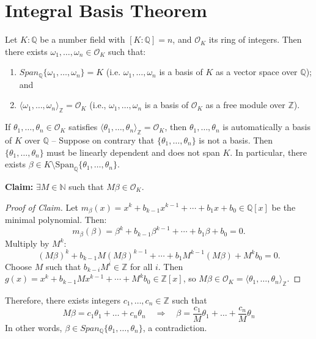 \section{Integral Basis Theorem}

\begin{theorem} \label{thm-intbasis}
Let $K:\mathbb{Q}$ be a number field with $[K:\mathbb{Q}] = n$, and $\mathcal{O}_K$ its ring of integers. Then there exists $\omega_1, \ldots, \omega_n \in \mathcal{O}_K$ such that:
\begin{enumerate}
    \item $Span_{\mathbb{Q}}\{\omega_1, \ldots, \omega_n\} = K$ (i.e. $\omega_1, \ldots, \omega_n$ is a basis of $K$ as a vector space over $\mathbb{Q}$); and
    \item $\langle \omega_1, \ldots, \omega_n \rangle_{\mathbb{Z}} = \mathcal{O}_K$ (i.e., $\omega_1, \ldots, \omega_n$ is a basis of $\mathcal{O}_K$ as a free module over $\mathbb{Z}$).
\end{enumerate}
\end{theorem}

\begin{remark}
If $\theta_1, \ldots, \theta_n \in \mathcal{O}_K$ satisfies $\langle \theta_1, \ldots, \theta_n \rangle_{\mathbb{Z}} = \mathcal{O}_K$, then $\theta_1, \ldots, \theta_n$ is automatically a basis of $K$ over $\mathbb{Q}$ -- Suppose on contrary that $\{\theta_1, \ldots, \theta_n\}$ is not a basis. Then $\{\theta_1, \ldots, \theta_n\}$ must be linearly dependent and does not span $K$. In particular, there exists $\beta \in K \setminus \mathrm{Span}_{\mathbb{Q}}\{\theta_1, \ldots, \theta_n\}$.

\medskip
\noindent \textbf{Claim:} $\exists M \in \mathbb{N}$ such that $M\beta \in \mathcal{O}_K$. 

\begin{proof}[Proof of Claim]
Let $m_\beta(x) = x^k + b_{k-1}x^{k-1} + \cdots + b_1x + b_0 \in \mathbb{Q}[x]$ be the minimal polynomial. Then:
$$
m_\beta(\beta) = \beta^k + b_{k-1}\beta^{k-1} + \cdots + b_1\beta + b_0 = 0.
$$
Multiply by $M^k$:
$$
(M\beta)^k + b_{k-1}M(M\beta)^{k-1} + \cdots + b_1M^{k-1}(M\beta) + M^k b_0 = 0.
$$
Choose $M$ such that $b_{k-i}M^i \in \mathbb{Z}$ for all $i$. Then $g(x) = x^k + b_{k-1}Mx^{k-1} + \cdots + M^k b_0 \in \mathbb{Z}[x]$, so $M\beta \in \mathcal{O}_K = \langle \theta_1, \ldots, \theta_n \rangle_{\mathbb{Z}}$.
\end{proof}
Therefore, there exists integers $c_1, \dots, c_n \in \mathbb{Z}$ such that 
$$M\beta = c_1\theta_1 + \dots + c_n\theta_n \quad \Rightarrow \quad \beta = \frac{c_1}{M}\theta_1 + \dots + \frac{c_n}{M}\theta_n$$
In other words, $\beta \in Span_{\mathbb{Q}}\{\theta_1,\dots,\theta_n\}$, a contradiction.
\end{remark}

